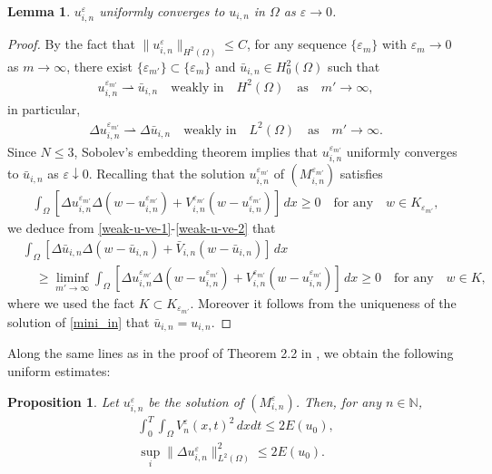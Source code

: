 \documentclass[12pt]{amsart}
\newtheorem{lem}{Lemma}[section]
\newtheorem{prop}{Proposition}[section]
\begin{document}
\begin{lem} \label{uniform-conv-1}
$u^{\varepsilon}_{i,n}$ uniformly converges to $u_{i,n}$ in $\Omega$ as ${\varepsilon} \to 0$. 
\end{lem}
\begin{proof}
By the fact that $\| u^{\varepsilon}_{i,n} \|_{H^2(\Omega)} \le C$, for any sequence $\{ {\varepsilon}_m \}$ with ${\varepsilon}_m \to 0$ as $m \to \infty$, 
there exist $\{ {\varepsilon}_{m'} \} \subset \{ {\varepsilon}_m \}$ 
and $\bar{u}_{i,n} \in H^2_0(\Omega)$ such that 
\begin{align} \label{weak-u-ve-1}
u^{{\varepsilon}_{m'}}_{i,n} \rightharpoonup \bar{u}_{i,n} \quad \text{weakly in} \quad H^2(\Omega) \quad \text{as} \quad m' \to \infty,  
\end{align}
in particular, 
\begin{align} \label{weak-u-ve-2}
\Delta u^{{\varepsilon}_{m'}}_{i,n} \rightharpoonup \Delta \bar{u}_{i,n} 
\quad \text{weakly in} \quad L^2(\Omega) \quad \text{as} \quad m' \to \infty. 
\end{align}
Since $N \le 3$, Sobolev's embedding theorem implies that $u^{{\varepsilon}_{m'}}_{i,n}$ uniformly converges to $\bar{u}_{i,n}$ as 
${\varepsilon} \downarrow 0$. 
Recalling that the solution $u^{{\varepsilon}_{m'}}_{i,n}$ of $(M^{{\varepsilon}_{m'}}_{i,n})$ satisfies 
\begin{align*} 
\int_\Omega \left[ \Delta u^{{\varepsilon}_{m'}}_{i,n} \Delta (w-u^{{\varepsilon}_{m'}}_{i,n}) + V^{{\varepsilon}_{m'}}_{i,n} (w-u^{{\varepsilon}_{m'}}_{i,n}) \right] \, dx \ge 0 
\quad \text{for any} \quad w \in K_{{\varepsilon}_{m'}}, 
\end{align*}
we deduce from \eqref{weak-u-ve-1}-\eqref{weak-u-ve-2} that    
\begin{align*}
&\int_\Omega \left[ \Delta \bar{u}_{i,n} \Delta (w-\bar{u}_{i,n}) + \bar{V}_{i,n} (w-\bar{u}_{i,n}) \right] \, dx \\
& \quad \ge \liminf_{m' \to \infty} 
    \int_\Omega \left[ \Delta u^{{\varepsilon}_{m'}}_{i,n} \Delta (w-u^{{\varepsilon}_{m'}}_{i,n}) + V^{{\varepsilon}_{m'}}_{i,n} (w-u^{{\varepsilon}_{m'}}_{i,n}) \right] \, dx
\ge 0 
\quad \text{for any} \quad w \in K,  
\end{align*}
where we used the fact $K \subset K_{{\varepsilon}_{m'}}$. 
Moreover it follows from the uniqueness of the solution of \eqref{mini_in} that $\bar{u}_{i,n}= u_{i,n}$. 
\end{proof}

Along the same lines as in the proof of Theorem 2.2  in \cite{NO}, we obtain the following uniform estimates: 
\begin{prop} \label{est-mini}
Let $u^{\varepsilon}_{i,n}$ be the solution of $(M^{\varepsilon}_{i,n})$. Then, for any $n \in {\mathbb{N}}$, 
\begin{gather}
\int^T_0 \!\!\! \int_\Omega V^{\varepsilon}_{n}(x,t)^2 \, dxdt \le 2 E(u_0), \label{bdd-V_n} \\
\sup_i \| \Delta u^{\varepsilon}_{i,n} \|_{L^2(\Omega)}^2 \le 2 E(u_0). \label{bdd-Delta-u_in}
\end{gather}
\end{prop}
\end{document}
